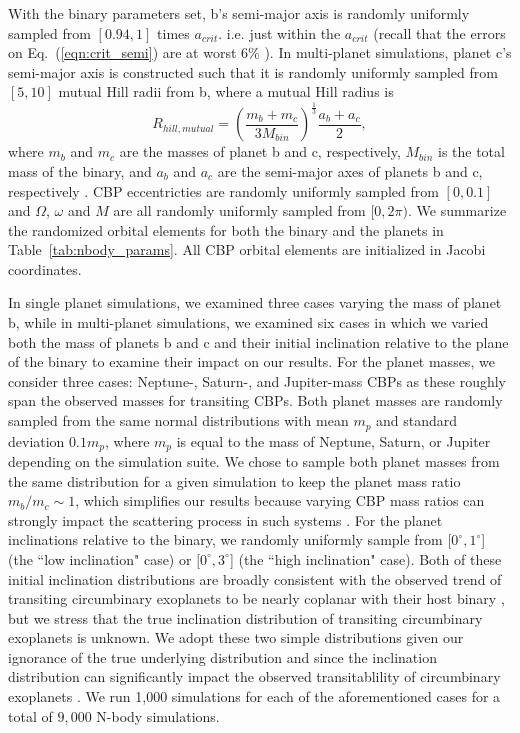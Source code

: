 With the binary parameters set, b's semi-major axis is randomly uniformly sampled from $[0.94,1]$ times $a_{crit}$. i.e. just within the $a_{crit}$ (recall that the errors on Eq.~(\ref{eqn:crit_semi}) are at worst $6\%$ \citep{Holman1999}).  In multi-planet simulations, planet c's semi-major axis is constructed such that it is randomly uniformly sampled from $[5,10]$ mutual Hill radii from b, where a mutual Hill radius is
\begin{equation} \label{eqn:mutual_hill_radius}
R_{hill, mutual} = \left( \frac{m_b + m_c}{3M_{bin}} \right)^{\frac{1}{3}} \frac{a_b + a_c}{2},
\end{equation}
where $m_b$ and $m_c$ are the masses of planet b and c, respectively, $M_{bin}$ is the total mass of the binary, and $a_b$ and $a_c$ are the semi-major axes of planets b and c, respectively \citep{Chambers1996}.  CBP eccentricties are randomly uniformly sampled from $[0,0.1]$ and $\Omega$, $\omega$ and $M$ are all randomly uniformly sampled from $[0,2\pi)$.  We summarize the randomized orbital elements for both the binary and the planets in Table~\ref{tab:nbody_params}.  All CBP orbital elements are initialized in Jacobi coordinates.

In single planet simulations, we examined three cases varying the mass of planet b, while in multi-planet simulations, we examined six cases in which we varied both the mass of planets b and c and their initial inclination relative to the plane of the binary to examine their impact on our results.  For the planet masses, we consider three cases: Neptune-, Saturn-, and Jupiter-mass CBPs as these roughly span the observed masses for transiting CBPs.  Both planet masses are randomly sampled from the same normal distributions with mean $m_p$ and standard deviation $0.1m_p$, where $m_p$ is equal to the mass of Neptune, Saturn, or Jupiter depending on the simulation suite.  We chose to sample both planet masses from the same distribution for a given simulation to keep the planet mass ratio $m_b/m_c {\sim} 1$, which simplifies our results because varying CBP mass ratios can strongly impact the scattering process in such systems \citep{Gong2017}.  For the planet inclinations relative to the binary, we randomly uniformly sample from $[0^{\circ},1^{\circ}$] (the ``low inclination" case) or $[0^{\circ},3^{\circ}$] (the ``high inclination" case).  Both of these initial inclination distributions are broadly consistent with the observed trend of transiting circumbinary exoplanets to be nearly coplanar with their host binary \citep[e.g.][]{Li2016}, but we stress that the true inclination distribution of transiting circumbinary exoplanets is unknown.  We adopt these two simple distributions given our ignorance of the true underlying distribution and since the inclination distribution can significantly impact the observed transitablility of circumbinary exoplanets \citep[see][]{Armstrong2014,Martin2015a}.  We run 1,000 simulations for each of the aforementioned cases for a total of $9,000$ N-body simulations.

